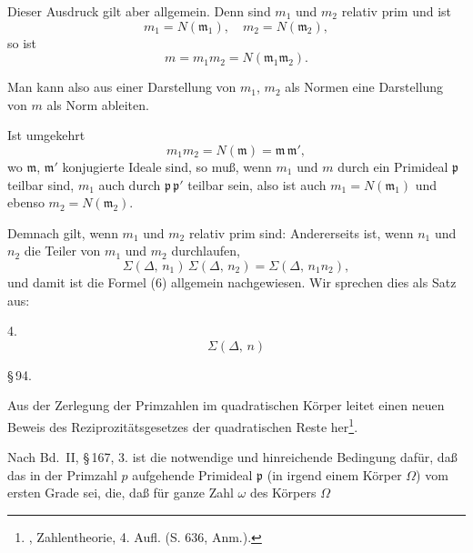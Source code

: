 
Dieser Ausdruck gilt aber allgemein. Denn sind $m_1$ und $m_2$
relativ prim und ist
\[
m_1 = N(\mathfrak{m}_1), \quad m_2 = N(\mathfrak{m}_2),
\]
so ist
\[
m = m_1 m_2 = N(\mathfrak{m}_1 \mathfrak{m}_2).
\]

Man kann also aus einer Darstellung von $m_1$, $m_2$ als Normen
eine Darstellung von $m$ als Norm ableiten.

Ist umgekehrt
\[
m_1 m_2 = N(\mathfrak{m}) = \mathfrak{m}\,\mathfrak{m}',
\]
wo $\mathfrak{m}$, $\mathfrak{m}'$ konjugierte Ideale sind, so muß, wenn $m_1$ und $m$ durch
ein Primideal $\mathfrak{p}$ teilbar sind, $m_1$ auch durch $\mathfrak{p}\,\mathfrak{p}'$ teilbar sein, also
ist auch $m_1 = N(\mathfrak{m}_1)$ und ebenso $m_2 = N(\mathfrak{m}_2)$.

Demnach gilt, wenn $m_1$ und $m_2$ relativ prim sind:
Andererseits ist, wenn $n_1$ und $n_2$ die Teiler von $m_1$ und $m_2$
durchlaufen,
\[
\Sigma(\Delta,\, n_1)\, \Sigma(\Delta,\, n_2) = \Sigma(\Delta,\, n_1 n_2),
\]
und damit ist die Formel (6) allgemein nachgewiesen. Wir
sprechen dies als Satz aus:

4. 
\[
\Sigma(\Delta,\, n)
\]

\S\,94. 

Aus der Zerlegung der Primzahlen im quadratischen Körper
leitet  einen neuen Beweis des Reziprozitätsgesetzes
der quadratischen Reste her\footnote{, Zahlentheorie, 4. Aufl. (S. 636, Anm.).}.

Nach Bd.\ II, \S\,167, 3. ist die notwendige und hinreichende
Bedingung dafür, daß das in der Primzahl $p$ aufgehende Primideal
 $\mathfrak{p}$ (in irgend einem Körper $\Omega$) vom ersten Grade sei, die,
daß für  ganze Zahl $\omega$ des Körpers $\Omega$
